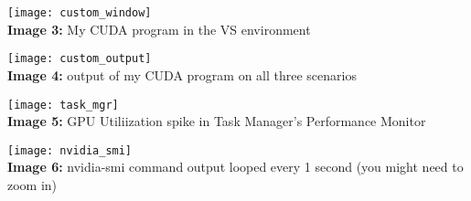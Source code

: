 \documentclass[]{report}
\begin{document}
\begin{center}
	\vspace{1em}
	\texttt{[image: custom\_window]} \\ \vspace{1em}
	\textbf{Image 3:} My CUDA program in the VS environment
	
	\texttt{[image: custom\_output]} \\ \vspace{1em}
	\textbf{Image 4:} output of my CUDA program on all three scenarios
	
	
	\vspace{1em}
	\texttt{[image: task\_mgr]} \\ \vspace{1em}
	\textbf{Image 5:} GPU Utiliization spike in Task Manager's Performance Monitor
	
	\texttt{[image: nvidia\_smi]} \\ \vspace{1em}
	\textbf{Image 6:} nvidia-smi command output looped every 1 second (you might need to zoom in)
\end{center}
\end{document}
